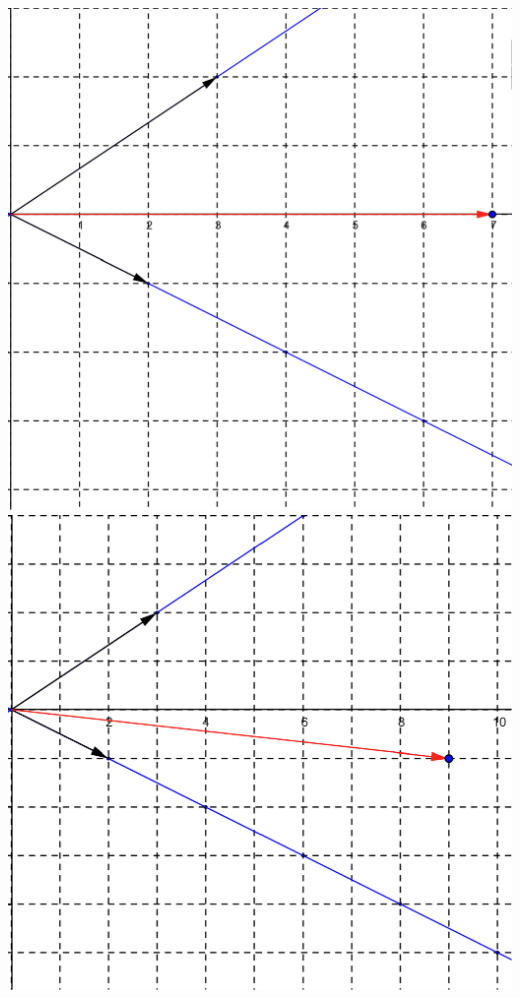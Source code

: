 \documentclass[english,9pt,xcolor=dvipsnames,notheorems]{beamer}
\begin{document}
\begin{frame}
\includegraphics[scale=0.2]{Learning_Standards_Revised_Summer_2023/Lectures/coordinate2.png}\quad \quad \includegraphics[scale=0.2]{Learning_Standards_Revised_Summer_2023/Lectures/coordinate4.png}


 \end{frame}
\end{document}
